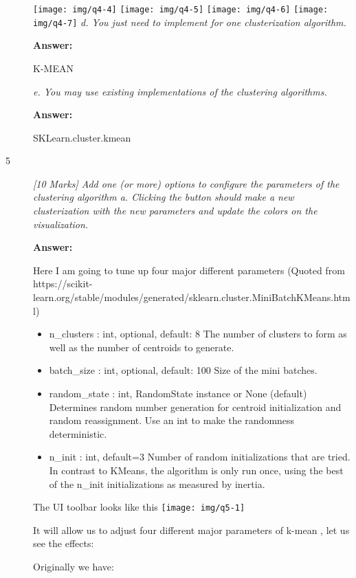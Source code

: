 \documentclass[]{report}
\begin{document}
\begin{description}
\texttt{[image: img/q4-4]}
\bigbreak
\texttt{[image: img/q4-5]}
\bigbreak
\texttt{[image: img/q4-6]}
\bigbreak
\texttt{[image: img/q4-7]}
\bigbreak
{\em d.	You just need to implement for one clusterization algorithm.}

\textbf{Answer:}

K-MEAN

{\em e.	You may use existing implementations of the clustering algorithms.}

\textbf{Answer:}

SKLearn.cluster.kmean

\item[5]
{\em [10 Marks] Add one (or more) options to configure the parameters of the clustering algorithm
	a.	Clicking the button should make a new clusterization with the new parameters and update the colors on the visualization.
}


\textbf{Answer:}

Here I am going to tune up four major different parameters (Quoted from https://scikit- learn.org/stable/modules/generated/sklearn.cluster.MiniBatchKMeans.html)

\begin{itemize}
\item n\_clusters : int, optional, default: 8
The number of clusters to form as well as the number of centroids to generate.

\item batch\_size : int, optional, default: 100
Size of the mini batches.

\item random\_state : int, RandomState instance or None (default)
Determines random number generation for centroid initialization and random reassignment. Use an int to make the randomness deterministic.

\item n\_init : int, default=3
Number of random initializations that are tried. In contrast to KMeans, the algorithm is only run once, using the best of the n\_init initializations as measured by inertia.
\end{itemize}

The UI toolbar looks like this
\texttt{[image: img/q5-1]}
\bigbreak

It will allow us to adjust four different major parameters of k-mean , let us see the effects:

Originally we have:


\end{description}
\end{document}
